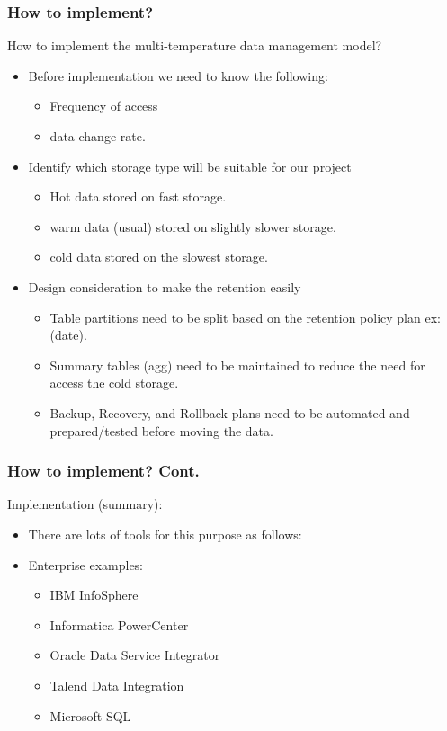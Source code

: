 \begin{frame}
\frametitle{How to implement?}

\begin{wideitemize}
	\item How to implement the multi-temperature data management model?
	\begin{itemize}[<+->]
		\item Before implementation we need to know the following:
			\begin{itemize}[<+->]
				\item Frequency of access
				\item data change rate.
			\end{itemize}
		\item Identify which storage type will be suitable for our project
			\begin{itemize}[<+->]
				\item Hot data stored on fast storage.
				\item warm data (usual) stored on slightly slower storage.
				\item cold data stored on the slowest storage.
			\end{itemize}
		\item Design consideration to make the retention easily
		\begin{itemize}[<+->]
			\item Table partitions need to be split based on the retention policy plan ex: (date). 
			\item Summary tables (agg) need to be maintained to reduce the need for access the cold storage.
			\item Backup, Recovery, and Rollback plans need to be automated and prepared/tested before moving the data.
		\end{itemize}
	\end{itemize}
\end{wideitemize}
\end{frame}


\begin{frame}
\frametitle{How to implement? Cont.}
\begin{wideitemize}
		\item Implementation (summary):
		\begin{itemize}[<+->]
			\item There are lots of tools for this purpose as follows:
			\item Enterprise examples:
			\begin{itemize}
				\item IBM InfoSphere
				\item Informatica PowerCenter
				\item Oracle Data Service Integrator
				\item Talend Data Integration				
				\item Microsoft SQL				
			\end{itemize}
		\end{itemize}
\end{wideitemize}
\end{frame}

